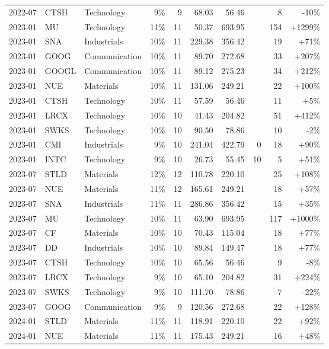 \documentclass[11pt,a4paper]{article}
\begin{document}
{\begin{longtable}{l l l r r r r r r r}
2022-07 & CTSH & Technology & 9\% & 9 & 68.03 & 56.46 &  & 8 & -10\% \\
2023-01 & MU & Technology & 11\% & 11 & 50.37 & 693.95 &  & 154 & +1299\% \\
2023-01 & SNA & Industrials & 10\% & 11 & 229.38 & 356.42 &  & 19 & +71\% \\
2023-01 & GOOG & Communication & 10\% & 11 & 89.70 & 272.68 &  & 33 & +207\% \\
2023-01 & GOOGL & Communication & 10\% & 11 & 89.12 & 275.23 &  & 34 & +212\% \\
2023-01 & NUE & Materials & 10\% & 11 & 131.06 & 249.21 &  & 22 & +100\% \\
2023-01 & CTSH & Technology & 10\% & 11 & 57.59 & 56.46 &  & 11 & +5\% \\
2023-01 & LRCX & Technology & 10\% & 10 & 41.43 & 204.82 &  & 51 & +412\% \\
2023-01 & SWKS & Technology & 10\% & 10 & 90.50 & 78.86 &  & 10 & -2\% \\
2023-01 & CMI & Industrials & 9\% & 10 & 241.04 & 422.79 & 0 & 18 & +90\% \\
2023-01 & INTC & Technology & 9\% & 10 & 26.73 & 55.45 & 10 & 5 & +51\% \\
2023-07 & STLD & Materials & 12\% & 12 & 110.78 & 220.10 &  & 25 & +108\% \\
2023-07 & NUE & Materials & 11\% & 12 & 165.61 & 249.21 &  & 18 & +57\% \\
2023-07 & SNA & Industrials & 11\% & 11 & 286.86 & 356.42 &  & 15 & +35\% \\
2023-07 & MU & Technology & 10\% & 11 & 63.90 & 693.95 &  & 117 & +1000\% \\
2023-07 & CF & Materials & 10\% & 10 & 70.43 & 115.04 &  & 18 & +77\% \\
2023-07 & DD & Industrials & 10\% & 10 & 89.84 & 149.47 &  & 18 & +77\% \\
2023-07 & CTSH & Technology & 10\% & 10 & 65.56 & 56.46 &  & 9 & -8\% \\
2023-07 & LRCX & Technology & 9\% & 10 & 65.10 & 204.82 &  & 31 & +224\% \\
2023-07 & SWKS & Technology & 9\% & 10 & 111.70 & 78.86 &  & 7 & -22\% \\
2023-07 & GOOG & Communication & 9\% & 9 & 120.56 & 272.68 &  & 22 & +128\% \\
2024-01 & STLD & Materials & 11\% & 11 & 118.91 & 220.10 &  & 22 & +92\% \\
2024-01 & NUE & Materials & 11\% & 11 & 175.43 & 249.21 &  & 16 & +48\% \\

\end{longtable}}
\end{document}
